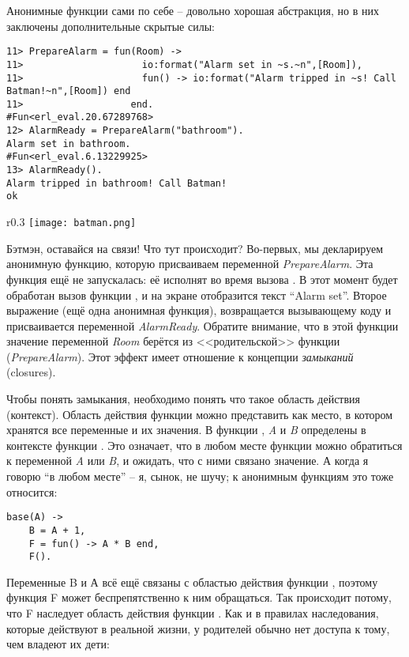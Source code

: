 Анонимные функции сами по себе \--- довольно хорошая абстракция, но в них заключены дополнительные скрытые силы:
\begin{lstlisting}[style=erlang]
11> PrepareAlarm = fun(Room) ->
11>                     io:format("Alarm set in ~s.~n",[Room]),
11>                     fun() -> io:format("Alarm tripped in ~s! Call Batman!~n",[Room]) end
11>                   end.
#Fun<erl_eval.20.67289768>
12> AlarmReady = PrepareAlarm("bathroom").
Alarm set in bathroom.
#Fun<erl_eval.6.13229925>
13> AlarmReady().
Alarm tripped in bathroom! Call Batman!
ok
\end{lstlisting}
\begin{wrapfigure}{r}{0.3\linewidth}
    \texttt{[image: batman.png]}
\end{wrapfigure}
Бэтмэн, оставайся на связи!
Что тут происходит?
Во\--первых, мы декларируем анонимную функцию, которую присваиваем переменной \emph{PrepareAlarm}.
Эта функция ещё не запускалась: её исполнят во время вызова .
В этот момент будет обработан вызов функции , и на экране отобразится текст ``Alarm set''.
Второе выражение (ещё одна анонимная функция), возвращается вызывающему коду и присваивается переменной \emph{AlarmReady}.
Обратите внимание, что в этой функции значение переменной \emph{Room} берётся из <<родительской>> функции (\emph{PrepareAlarm}).
Этот эффект имеет отношение к концепции \emph{замыканий} (closures).

Чтобы понять замыкания, необходимо понять что такое область действия (контекст).
Область действия функции можно представить как место, в котором хранятся все переменные и их значения.
В функции , \emph{A} и \emph{B} определены в контексте функции .
Это означает, что в любом месте функции  можно обратиться к переменной \emph{A} или \emph{B}, и ожидать, что с ними связано значение.
А когда я говорю ``в любом месте'' \--- я, сынок, не шучу; к анонимным функциям это тоже относится:
\begin{lstlisting}[style=erlang]
base(A) ->
    B = A + 1,
    F = fun() -> A * B end,
    F().
\end{lstlisting}

Переменные B и А всё ещё связаны с областью действия функции , поэтому функция F может беспрепятственно к ним обращаться.
Так происходит потому, что F наследует область действия функции .
Как и в правилах наследования, которые действуют в реальной жизни, у родителей обычно нет доступа к тому, чем владеют их дети:

